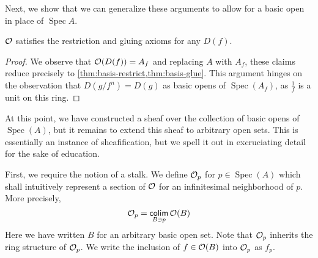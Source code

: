 \documentclass{amsart}
\DeclareMathOperator{\Spec}{Spec}
\begin{document}
Next, we show that we can generalize these arguments to allow for a basic open in place of $\Spec
A$.
\begin{theorem}
  \label{thm:basis-sheaf}
  $\mathcal{O}$ satisfies the restriction and gluing axioms for any $D(f)$.
\end{theorem}
\begin{proof}
  We observe that $\mathcal{O}(D(f)) = A_f$ and replacing $A$ with $A_f$, these claims reduce
  precisely to \cref{thm:basis-restrict,thm:basis-glue}. This argument hinges on the observation
  that $D(g/f^n) = D(g)$ as basic opens of $\Spec(A_f)$, as $\frac{1}{f}$ is a unit on this ring.
\end{proof}

At this point, we have constructed a sheaf over the collection of basic opens of $\Spec(A)$, but it
remains to extend this sheaf to arbitrary open sets. This is essentially an instance of
sheafification, but we spell it out in excruciating detail for the sake of education.

First, we require the notion of a stalk. We define $\mathcal{O}_p$ for $p \in \Spec(A)$ which shall
intuitively represent a section of $\mathcal{O}$ for an infinitesimal neighborhood of $p$. More
precisely,
\begin{equation}
  \label{eq:stalk}
  \mathcal{O}_p = \mathop{\mathsf{colim}}_{B \ni p} \mathcal{O}(B)
\end{equation}
Here we have written $B$ for an arbitrary basic open set. Note that $\mathcal{O}_p$ inherits the ring
structure of $\mathcal{O}_p$. We write the inclusion of $f \in \mathcal{O}(B)$ into $\mathcal{O}_p$ as
$f_p$.
\end{document}
